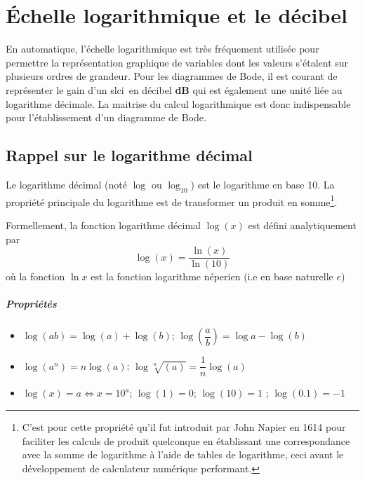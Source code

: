 \chapter{\'Echelle logarithmique et le décibel~\label{annexe-log}}

En automatique, l'échelle logarithmique est très fréquement 
utilisée pour permettre la représentation
graphique de variables dont les valeurs s'étalent sur plusieurs ordres de grandeur. 
Pour les diagrammes de Bode, il est courant de représenter le gain 
d'un \gls{slci}~en décibel \textbf{dB} qui est également une unité liée au logarithme décimale. 
La maitrise du calcul logarithmique est donc indispensable 
pour l'établissement d'un diagramme de Bode.

\section{Rappel sur le logarithme décimal}
Le logarithme décimal (noté $\log$ ou $\log_{10}$) est le logarithme en base 10.
La propriété principale du logarithme est de transformer un 
produit en somme\footnote{C'est pour cette propriété qu'il 
fut introduit par John Napier en 1614 pour faciliter les calculs de produit quelconque
en établissant une correspondance avec la somme de logarithme 
à l'aide de tables de logarithme, ceci avant le 
développement de calculateur numérique performant.}.

Formellement, la fonction logarithme décimal $\log{(x)}$ est défini analytiquement par 
$$
\log{(x)}=\dfrac{\ln{(x)}}{\ln{(10)}}
$$
où la fonction $\ln{x}$ est la fonction logarithme néperien (i.e en base naturelle $e$) 

\paragraph{Propriétés}
\begin{itemize}
    \item $\log{(ab)}=\log{(a)} + \log{(b)}$; $\log{\left(\dfrac{a}{b}\right)}=\log{a} - \log{(b)}$
    \item $\log{(a^n)}=n\log{(a)}$; $\log{\sqrt[n]{(a)}}=\dfrac{1}{n}\log{(a)}$
    \item $\log(x)=a \Leftrightarrow x=10^a $; $\log(1) = 0$; $\log(10) = 1$ ; $\log(0.1) = -1$
\end{itemize}


